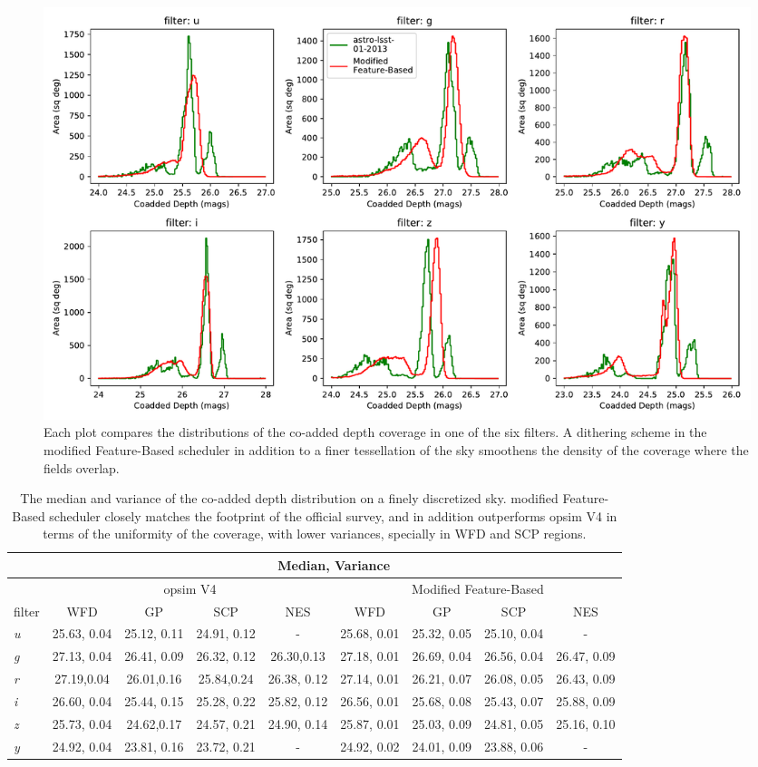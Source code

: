 \documentclass[12pt]{aastex62}
\theoremstyle{definition}
\begin{document}
\begin{figure}[h!]
\centering
\includegraphics[width=1.0\linewidth]{Co_addedHist10yrs.pdf}
\caption{Each plot compares the distributions of the co-added depth coverage in one of the six filters. A dithering scheme in the modified Feature-Based scheduler in addition to a finer tessellation of the sky smoothens the density of the coverage where the fields overlap.}
\label{fig_10yrs_hist}
\end{figure}


\begin{table}
\caption{The median and variance of the co-added depth distribution on a finely discretized sky. modified Feature-Based scheduler closely matches the footprint of the official survey, and in addition outperforms opsim V4 in terms of the uniformity of the coverage, with lower variances, specially in WFD and SCP regions.}\label{table_10yrs_hist}
\begin{center}
\begin{tabular}{l|cccc|cccc} \hline
&\multicolumn{8}{c}{Median, Variance} \\ \hline
&\multicolumn{4}{c|}{opsim V4} &\multicolumn{4}{c}{Modified Feature-Based} \\
filter  & WFD & GP & SCP & NES & WFD & GP & SCP & NES\\
\hline
\textit{u}& 25.63, 0.04 & 25.12, 0.11& 24.91, 0.12& - &25.68, 0.01 &25.32, 0.05 & 25.10, 0.04& -\\
\textit{g}& 27.13, 0.04 & 26.41, 0.09& 26.32, 0.12 & 26.30,0.13& 27.18, 0.01 & 26.69, 0.04&26.56, 0.04 &26.47, 0.09 \\
\textit{r}& 27.19,0.04 & 26.01,0.16& 25.84,0.24 & 26.38, 0.12 & 27.14, 0.01& 26.21, 0.07 & 26.08, 0.05 & 26.43, 0.09\\
\textit{i}& 26.60, 0.04 & 25.44, 0.15 & 25.28, 0.22 & 25.82, 0.12 & 26.56, 0.01 & 25.68, 0.08 & 25.43, 0.07 & 25.88, 0.09\\
\textit{z}& 25.73, 0.04& 24.62,0.17& 24.57, 0.21& 24.90, 0.14 & 25.87, 0.01 & 25.03, 0.09 & 24.81, 0.05 & 25.16, 0.10\\
\textit{y}& 24.92, 0.04 & 23.81, 0.16 & 23.72, 0.21& - & 24.92, 0.02 & 24.01, 0.09 &23.88, 0.06 & -\\
\end{tabular}
\end{center}
\end{table}
\end{document}
